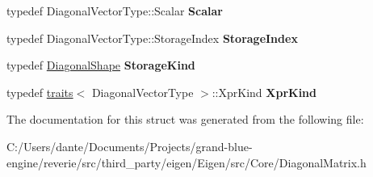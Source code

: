 \begin{DoxyCompactItemize}
typedef Diagonal\+Vector\+Type\+::\+Scalar {\bfseries Scalar}
\item 
\mbox{\label{struct_eigen_1_1internal_1_1traits_3_01_diagonal_wrapper_3_01___diagonal_vector_type_01_4_01_4_ad7c6e6f2f3b91e30101ef6c77b74b4f4}} 
typedef Diagonal\+Vector\+Type\+::\+Storage\+Index {\bfseries Storage\+Index}
\item 
\mbox{\label{struct_eigen_1_1internal_1_1traits_3_01_diagonal_wrapper_3_01___diagonal_vector_type_01_4_01_4_a0a13f32c0baa568450ae10e731bd0bbf}} 
typedef \mbox{\hyperlink{struct_eigen_1_1_diagonal_shape}{Diagonal\+Shape}} {\bfseries Storage\+Kind}
\item 
\mbox{\label{struct_eigen_1_1internal_1_1traits_3_01_diagonal_wrapper_3_01___diagonal_vector_type_01_4_01_4_ae95c2f4b8be356abdbd30d9c582a98fa}} 
typedef \mbox{\hyperlink{struct_eigen_1_1internal_1_1traits}{traits}}$<$ Diagonal\+Vector\+Type $>$\+::Xpr\+Kind {\bfseries Xpr\+Kind}
\end{DoxyCompactItemize}


The documentation for this struct was generated from the following file\+:\begin{DoxyCompactItemize}
\item 
C\+:/\+Users/dante/\+Documents/\+Projects/grand-\/blue-\/engine/reverie/src/third\+\_\+party/eigen/\+Eigen/src/\+Core/Diagonal\+Matrix.\+h\end{DoxyCompactItemize}
